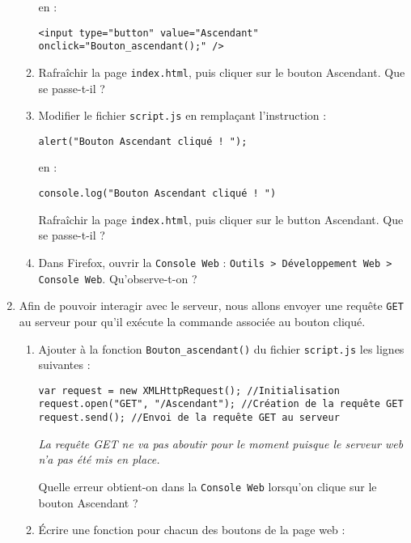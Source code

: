 \documentclass[a4paper]{article}
\begin{document}
\begin{enumerate}
\begin{enumerate}
	en :

	\begin{verbatim}
<input type="button" value="Ascendant" onclick="Bouton_ascendant();" />
	\end{verbatim}

      \item Rafraîchir la page \verb|index.html|, puis cliquer sur le bouton \og{}Ascendant\fg{}. Que se passe-t-il ?
      \item Modifier le fichier \verb|script.js| en remplaçant l'instruction :

	\begin{verbatim}
alert("Bouton Ascendant cliqué ! ");
	\end{verbatim}

	en :

	\begin{verbatim}
console.log("Bouton Ascendant cliqué ! ")
	\end{verbatim}

	Rafraîchir la page \verb|index.html|, puis cliquer sur le button \og{}Ascendant\fg. Que se passe-t-il ?
      \item Dans Firefox, ouvrir la \verb|Console Web| : \verb|Outils > Développement Web > Console Web|. Qu'observe-t-on ?
    \end{enumerate}

    \pagebreak

  \item Afin de pouvoir interagir avec le serveur, nous allons envoyer une requête \verb|GET| au serveur pour qu'il exécute la commande associée au bouton cliqué.
    \begin{enumerate}
      \item Ajouter à la fonction \texttt{Bouton_ascendant()} du fichier \verb|script.js| les lignes suivantes :

	\begin{verbatim}
var request = new XMLHttpRequest(); //Initialisation
request.open("GET", "/Ascendant"); //Création de la requête GET
request.send(); //Envoi de la requête GET au serveur
	\end{verbatim}

	\textit{La requête GET ne va pas aboutir pour le moment puisque le serveur web n'a pas été mis en place.}

	Quelle erreur obtient-on dans la \verb|Console Web| lorsqu'on clique sur le bouton \og{}Ascendant\fg{} ?
      \item Écrire une fonction pour chacun des boutons de la page web :


\end{enumerate}
\end{enumerate}
\end{document}
